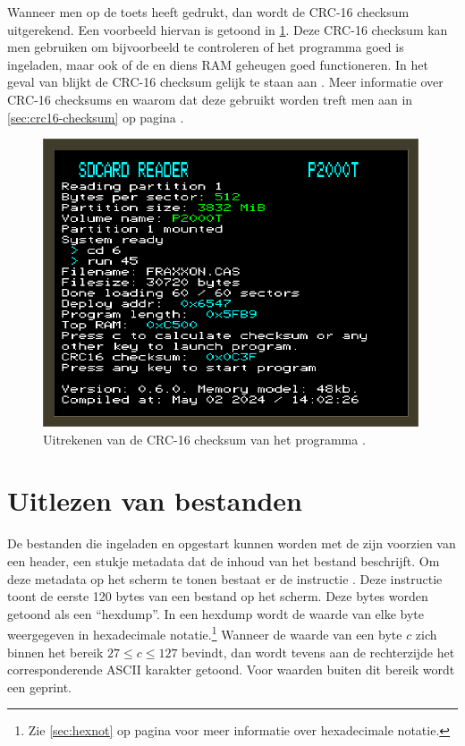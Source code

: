 Wanneer men op de  toets heeft gedrukt, dan wordt de CRC-16 checksum uitgerekend. Een voorbeeld hiervan is getoond in \cref{fig:screenshot-run-fraxon-checksum}. Deze CRC-16 checksum kan men gebruiken om bijvoorbeeld te controleren of het programma goed is ingeladen, maar ook of de \product en diens RAM geheugen goed functioneren. In het geval van  blijkt de CRC-16 checksum gelijk te staan aan . Meer informatie over CRC-16 checksums en waarom dat deze gebruikt worden treft men aan in \cref{sec:crc16-checksum} op pagina \pageref{sec:crc16-checksum}.

\begin{figure}[h!]
    \centering
    \includegraphics[width=0.99\textwidth]{img/run-fraxxon-checksum.png}
    \caption{Uitrekenen van de CRC-16 checksum van het programma .}
    \label{fig:screenshot-run-fraxon-checksum}
\end{figure}

%
%
%
\section{Uitlezen van bestanden}
\label{sec:hexdump}

De bestanden die ingeladen en opgestart kunnen worden met de \product zijn voorzien van een header, een stukje metadata dat de inhoud van het bestand beschrijft. Om deze metadata op het scherm te tonen bestaat er de instructie . Deze instructie toont de eerste 120 bytes van een bestand op het scherm. Deze bytes worden getoond als een ``hexdump''. In een hexdump wordt de waarde van elke byte weergegeven in hexadecimale notatie.\footnote{Zie \cref{sec:hexnot} op pagina \pageref{sec:hexnot} voor meer informatie over hexadecimale notatie.} Wanneer de waarde van een byte $c$ zich binnen het bereik $27 \leq c \leq 127$ bevindt, dan wordt tevens aan de rechterzijde het corresponderende ASCII karakter getoond. Voor waarden buiten dit bereik wordt een  geprint.

